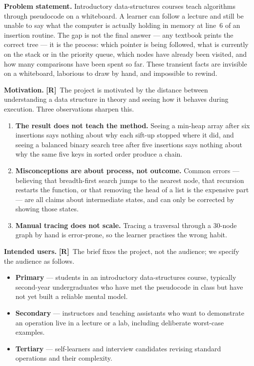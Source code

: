 \documentclass[11pt,a4paper]{article}
\newcommand{\R}{\textcolor{reqc}{\textbf{[R]}}}     %
\begin{document}
\medskip
\noindent\textbf{Problem statement.} Introductory data-structures courses teach algorithms
through pseudocode on a whiteboard. A learner can follow a lecture and still be unable to say
what the computer is actually holding in memory at line~6 of an insertion routine. The gap is
not the final answer --- any textbook prints the correct tree --- it is the process: which
pointer is being followed, what is currently on the stack or in the priority queue, which nodes
have already been visited, and how many comparisons have been spent so far. These transient
facts are invisible on a whiteboard, laborious to draw by hand, and impossible to rewind.

\medskip
\noindent\textbf{Motivation.} \R\ The project is motivated by the distance between
understanding a data structure in theory and seeing how it behaves during execution. Three
observations sharpen this.

\begin{enumerate}[leftmargin=1.6em,topsep=2pt,itemsep=2pt]
  \item \textbf{The result does not teach the method.} Seeing a min-heap array after six
        insertions says nothing about why each sift-up stopped where it did, and seeing a
        balanced binary search tree after five insertions says nothing about why the same five
        keys in sorted order produce a chain.
  \item \textbf{Misconceptions are about process, not outcome.} Common errors --- believing that
        breadth-first search jumps to the nearest node, that recursion restarts the function, or
        that removing the head of a list is the expensive part --- are all claims about
        intermediate states, and can only be corrected by showing those states.
  \item \textbf{Manual tracing does not scale.} Tracing a traversal through a 30-node graph by
        hand is error-prone, so the learner practises the wrong habit.
\end{enumerate}

\medskip
\noindent\textbf{Intended users.} \R\ The brief fixes the project, not the audience; we specify
the audience as follows.

\begin{itemize}[leftmargin=1.4em,topsep=2pt,itemsep=1pt]
  \item \textbf{Primary} --- students in an introductory data-structures course, typically
        second-year undergraduates who have met the pseudocode in class but have not yet built
        a reliable mental model.
  \item \textbf{Secondary} --- instructors and teaching assistants who want to demonstrate an
        operation live in a lecture or a lab, including deliberate worst-case examples.
  \item \textbf{Tertiary} --- self-learners and interview candidates revising standard
        operations and their complexity.
\end{itemize}
\end{document}
